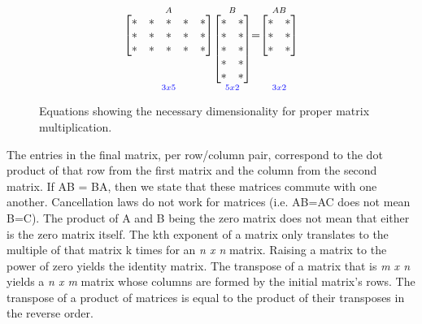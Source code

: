 \documentclass[12pt]{article}
\begin{document}
\begin{figure}
\begin{align*}
    \overset{A}{\underset{\textcolor{blue}{3 x 5}}{
        \begin{array}{@{}c@{}}{
            \begin{bmatrix}
                * & * & * & * & * \\
                * & * & * & * & * \\
                * & * & * & * & * 
            \end{bmatrix}} \\ \\ \\
        \end{array}
    }}
    \overset{B}{\underset{\textcolor{blue}{5 x 2}}{
    \begin{bmatrix}
        * & * \\
        * & * \\
        * & * \\
        * & * \\
        * & *
    \end{bmatrix}}}
    \begin{array}{@{}c@{}}{
        =
    } \\ \\ \\  
    \end{array}
    \overset{AB}{\underset{\textcolor{blue}{3 x 2}}{
        \begin{array}{@{}c@{}}{
            \begin{bmatrix}
                * & * \\ 
                * & * \\ 
                * & * 
            \end{bmatrix}} \\ \\ \\
        \end{array}
    }}
\end{align*}
\caption{Equations showing the necessary dimensionality for proper matrix multiplication.}
\end{figure}
The entries in the final matrix, per row/column pair, correspond to the dot product of that row from the first matrix and the column from the second matrix. %
If AB = BA, then we state that these matrices commute with one another. Cancellation laws do not work for matrices (i.e. AB=AC does not mean B=C). %
The product of A and B being the zero matrix does not mean that either is the zero matrix itself. The kth exponent of a matrix only translates to the multiple of that matrix %
k times for an \textit{n x n} matrix. Raising a matrix to the power of zero yields the identity matrix. The transpose of a matrix that is \textit{m x n} yields %
a \textit{n x m} matrix whose columns are formed by the initial matrix's rows. The transpose of a product of matrices is equal to the product of their transposes %
in the reverse order. 
\end{document}
